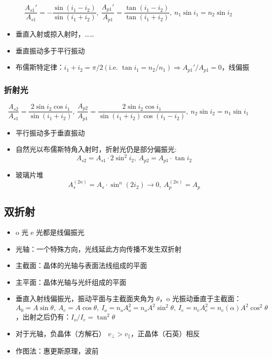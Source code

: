 \documentclass{article}
\begin{document}
$$
    \frac{A_{s1}'}{A_{s1}}=-\frac{\sin(i_1-i_2)}{\sin(i_1+i_2)},\ \frac{A_{p1}'}{A_{p1}}=\frac{\tan(i_1-i_2)}{\tan(i_1+i_2)},\ n_1\sin i_1=n_2\sin i_2
$$
\begin{itemize}
    \item 垂直入射或掠入射时，……
    \item 垂直振动多于平行振动
    \item 布儒斯特定律：$i_1+i_2=\pi/2(\text{i.e. }\tan i_1=n_2/n_1)\Rightarrow A_{p1}'/A_{p1}=0$，线偏振
\end{itemize}

\subsubsection{折射光}

$$
    \frac{A_{s2}}{A_{s1}}=\frac{2\sin i_2\cos i_1}{\sin(i_1+i_2)},\ \frac{A_{p2}}{A_{p1}}=\frac{2\sin i_2\cos i_1}{\sin(i_1+i_2)\cos(i_1-i_2)},\ n_2\sin i_2=n_1\sin i_1
$$
\begin{itemize}
    \item 平行振动多于垂直振动
    \item 自然光以布儒斯特角入射时，折射光仍是部分偏振光: $$
              A_{s2}=A_{s1}\cdot 2\sin^2i_2,\ A_{p2}=A_{p1}\cdot\tan i_2
          $$
    \item 玻璃片堆 $$
              A_{s}^{(2n)}=A_s\cdot\sin^n(2i_2)\to 0,\ A_{p}^{(2n)}=A_p
          $$
\end{itemize}

\subsection{双折射}

\begin{itemize}
    \item o 光 e 光都是线偏振光
    \item 光轴：一个特殊方向，光线延此方向传播不发生双折射
    \item 主截面：晶体的光轴与表面法线组成的平面
    \item 主平面：晶体光轴与光纤组成的平面
    \item 垂直入射线偏振光，振动平面与主截面夹角为 $\theta$，o 光振动垂直于主截面：$A_0=A\sin\theta,\ A_e=A\cos\theta,\ I_o=n_oA_o^2=n_oA^2\sin^2\theta,\ I_e=n_eA_e^2=n_e(\alpha)A^2\cos^2\theta$，出射之后仍有：$I_o/I_e=\tan^2\theta$
    \item 对于光轴，负晶体（方解石） $v_{\perp}>v_{\parallel}$，正晶体（石英）相反
    \item 作图法：惠更斯原理，波前
\end{itemize}
\end{document}
